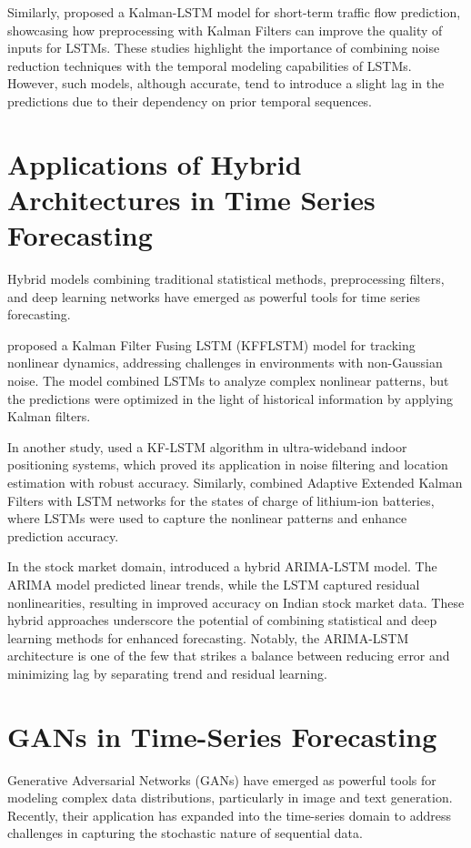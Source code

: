 Similarly, \textcite{fang_kalman-lstm_2021} proposed a Kalman-LSTM model for short-term traffic flow prediction, showcasing how preprocessing with Kalman Filters can improve the quality of inputs for LSTMs. These studies highlight the importance of combining noise reduction techniques with the temporal modeling capabilities of LSTMs. However, such models, although accurate, tend to introduce a slight lag in the predictions due to their dependency on prior temporal sequences.

\section{Applications of Hybrid Architectures in Time Series Forecasting}
Hybrid models combining traditional statistical methods, preprocessing filters, and deep learning networks have emerged as powerful tools for time series forecasting.

\textcite{song_improved_2022} proposed a Kalman Filter Fusing LSTM (KFFLSTM) model for tracking nonlinear dynamics, addressing challenges in environments with non-Gaussian noise. The model combined LSTMs to analyze complex nonlinear patterns, but the predictions were optimized in the light of historical information by applying Kalman filters.

In another study, \textcite{tian_application_2024} used a KF-LSTM algorithm in ultra-wideband indoor positioning systems, which proved its application in noise filtering and location estimation with robust accuracy. Similarly, \textcite{wang_hybrid_2024} combined Adaptive Extended Kalman Filters with LSTM networks for the states of charge of lithium-ion batteries, where LSTMs were used to capture the nonlinear patterns and enhance prediction accuracy.

In the stock market domain, \textcite{sahni_neoteric_2022} introduced a hybrid ARIMA-LSTM model. The ARIMA model predicted linear trends, while the LSTM captured residual nonlinearities, resulting in improved accuracy on Indian stock market data. These hybrid approaches underscore the potential of combining statistical and deep learning methods for enhanced forecasting. Notably, the ARIMA-LSTM architecture is one of the few that strikes a balance between reducing error and minimizing lag by separating trend and residual learning.

\section{GANs in Time-Series Forecasting}
Generative Adversarial Networks (GANs) have emerged as powerful tools for modeling complex data distributions, particularly in image and text generation. Recently, their application has expanded into the time-series domain to address challenges in capturing the stochastic nature of sequential data.

